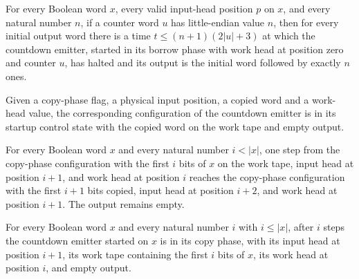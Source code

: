 \begin{lemma}
\label{Complexity.a2_countdown}
\leanok
{}
For every Boolean word $x$, every valid input-head position $p$ on $x$, and every
natural number $n$, if a counter word $u$ has little-endian value $n$, then for every
initial output word there is a time $t\le (n+1)(2|u|+3)$ at which the countdown emitter,
started in its borrow phase with work head at position zero and counter $u$, has halted
and its output is the initial word followed by exactly $n$ ones.
\end{lemma}

\begin{definition}
\label{Complexity.a2LoadCfg}
\leanok
{}
Given a copy-phase flag, a physical input position, a copied word and a work-head value, the corresponding configuration of the countdown emitter is in its startup control state with the copied word on the work tape and empty output.
\end{definition}

\begin{lemma}
\label{Complexity.a2_copy_step}
\leanok
{}
For every Boolean word $x$ and every natural number $i<|x|$, one step from the
copy-phase configuration with the first $i$ bits of $x$ on the work tape, input head at
position $i+1$, and work head at position $i$ reaches the copy-phase configuration with
the first $i+1$ bits copied, input head at position $i+2$, and work head at position
$i+1$. The output remains empty.
\end{lemma}

\begin{lemma}
\label{Complexity.a2_copy_run}
\leanok
{}
For every Boolean word $x$ and every natural number $i$ with $i\le |x|$, after $i$ steps
the countdown emitter started on $x$ is in its copy phase, with its input head at
position $i+1$, its work tape containing the first $i$ bits of $x$, its work head at
position $i$, and empty output.
\end{lemma}

